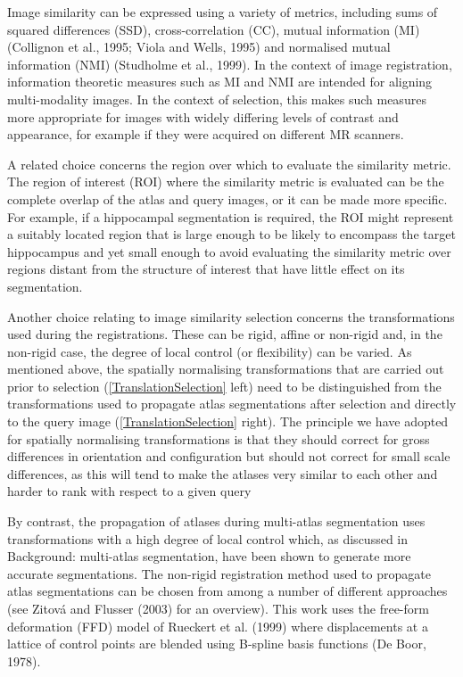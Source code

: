 Image similarity can be expressed using a variety of metrics,
including sums of squared differences (SSD), cross-correlation (CC),
mutual information (MI) (Collignon et al., 1995; Viola and Wells, 1995)
and normalised mutual information (NMI) (Studholme et al., 1999). In
the context of image registration, information theoretic measures such
as MI and NMI are intended for aligning multi-modality images. In the
context of selection, this makes such measures more appropriate for
images with widely differing levels of contrast and appearance, for
example if they were acquired on different MR scanners.

A related choice concerns the region over which to evaluate the
similarity metric. The region of interest (ROI) where the similarity
metric is evaluated can be the complete overlap of the atlas and query
images, or it can be made more specific. For example, if a hippocampal
segmentation is required, the ROI might represent a suitably located
region that is large enough to be likely to encompass the target
hippocampus and yet small enough to avoid evaluating the similarity
metric over regions distant from the structure of interest that have
little effect on its segmentation.

Another choice relating to image similarity selection concerns the
transformations used during the registrations. These can be rigid,
affine or non-rigid and, in the non-rigid case, the degree of local
control (or flexibility) can be varied. As mentioned above, the spatially
normalising transformations that are carried out prior to selection
(\ref{TranslationSelection} left)
need to be distinguished from the transformations used to
propagate atlas segmentations after selection and directly to the
query image (\ref{TranslationSelection} right).
The principle we have adopted for spatially
normalising transformations is that they should correct for gross
differences in orientation and configuration but should not correct for
small scale differences, as this will tend to make the atlases very
similar to each other and harder to rank with respect to a given query

By contrast, the propagation of atlases during multi-atlas segmentation
uses transformations with a high degree of local control which,
as discussed in Background: multi-atlas segmentation, have been
shown to generate more accurate segmentations. The non-rigid
registration method used to propagate atlas segmentations can be
chosen from among a number of different approaches (see Zitová and
Flusser (2003) for an overview). This work uses the free-form
deformation (FFD) model of Rueckert et al. (1999) where displacements
at a lattice of control points are blended using B-spline basis
functions (De Boor, 1978).

